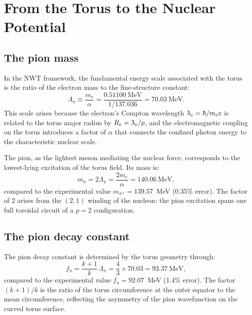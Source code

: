 \documentclass[11pt,a4paper]{article}
\newcommand{\lambdabar}{\mkern0.75mu\mathchar'26\mkern-9.75mu\lambda}
\begin{document}
\section{From the Torus to the Nuclear Potential}
\label{sec:pion}

\subsection{The pion mass}

In the NWT framework, the fundamental energy scale associated with the torus
is the ratio of the electron mass to the fine-structure constant:
\begin{equation}
  \Lambda_\pi \equiv \frac{m_e}{\alpha} = \frac{0.51100~\text{MeV}}{1/137.036}
  = 70.03~\text{MeV}.
  \label{eq:lambda-pi}
\end{equation}
This scale arises because the electron's Compton wavelength $\lambdabar_e = \hbar/m_e c$
is related to the torus major radius by $R_e = \lambdabar_e / p$, and the
electromagnetic coupling on the torus introduces a factor of $\alpha$ that
connects the confined photon energy to the characteristic nuclear scale.

The pion, as the lightest meson mediating the nuclear force, corresponds to the
lowest-lying excitation of the torus field.  Its mass is:
\begin{equation}
  m_\pi = 2\Lambda_\pi = \frac{2m_e}{\alpha} = 140.06~\text{MeV},
  \label{eq:mpi}
\end{equation}
compared to the experimental value $m_{\pi^\pm} = 139.57$~MeV (0.35\% error).
The factor of 2 arises from the $(2,1)$ winding of the nucleon: the pion
excitation spans one full toroidal circuit of a $p=2$ configuration.

\subsection{The pion decay constant}

The pion decay constant is determined by the torus geometry through:
\begin{equation}
  f_\pi = \frac{k+1}{k}\,\Lambda_\pi = \frac{4}{3} \times 70.03 = 93.37~\text{MeV},
  \label{eq:fpi}
\end{equation}
compared to the experimental value $f_\pi = 92.07$~MeV (1.4\% error).  The
factor $(k+1)/k$ is the ratio of the torus circumference at the outer equator
to the mean circumference, reflecting the asymmetry of the pion wavefunction
on the curved torus surface.
\end{document}
